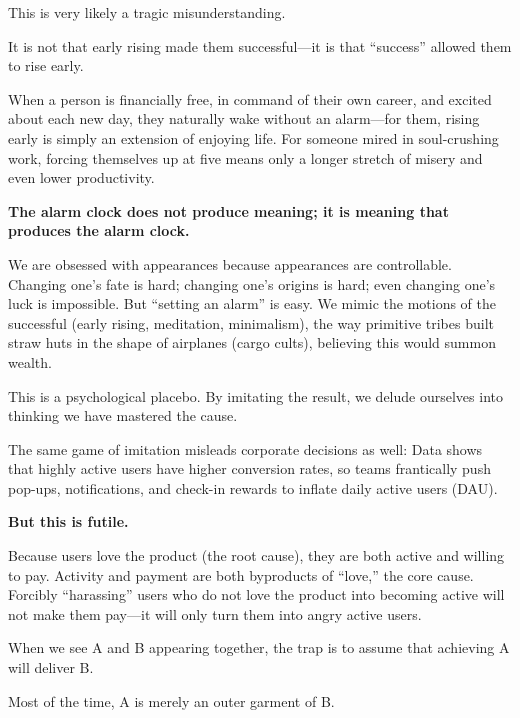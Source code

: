 This is very likely a tragic misunderstanding.

It is not that early rising made them successful---it is that ``success'' allowed them to rise early.

When a person is financially free, in command of their own career, and excited about each new day, they naturally wake without an alarm---for them, rising early is simply an extension of enjoying life. For someone mired in soul-crushing work, forcing themselves up at five means only a longer stretch of misery and even lower productivity.

\vspace{1em}

\textbf{The alarm clock does not produce meaning; it is meaning that produces the alarm clock.}

We are obsessed with appearances because appearances are controllable. Changing one's fate is hard; changing one's origins is hard; even changing one's luck is impossible. But ``setting an alarm'' is easy.
We mimic the motions of the successful (early rising, meditation, minimalism), the way primitive tribes built straw huts in the shape of airplanes (cargo cults), believing this would summon wealth.

This is a psychological placebo. By imitating the result, we delude ourselves into thinking we have mastered the cause.

\vspace{1em}

The same game of imitation misleads corporate decisions as well:
Data shows that highly active users have higher conversion rates, so teams frantically push pop-ups, notifications, and check-in rewards to inflate daily active users (DAU).

\vspace{1em}

\textbf{But this is futile.}

Because users love the product (the root cause), they are both active and willing to pay.
Activity and payment are both byproducts of ``love,'' the core cause.
Forcibly ``harassing'' users who do not love the product into becoming active will not make them pay---it will only turn them into angry active users.

\vspace{1em}

When we see A and B appearing together, the trap is to assume that achieving A will deliver B.

Most of the time, A is merely an outer garment of B.

